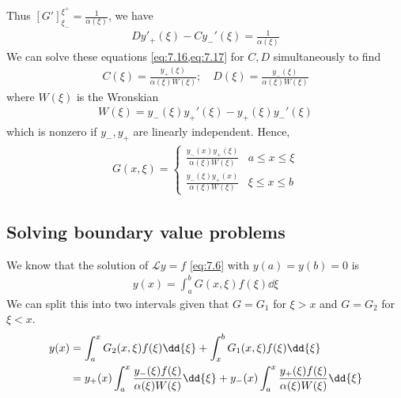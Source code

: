 Thus $[G']_{\xi_-}^{\xi^+} = \frac{1}{\alpha(\xi)}$, we have
\begin{align} \label{eq:7.17}
	Dy'_+(\xi) - C y_-'(\xi) = \frac{1}{\alpha(\xi)}
\end{align}
We can solve these equations \cref{eq:7.16,eq:7.17} for $C, D$ simultaneously to find
\begin{align} \label{eq:7.18}
	C(\xi) = \frac{y_+(\xi)}{\alpha(\xi)W(\xi)};\quad D(\xi) = \frac{y_-(\xi)}{\alpha(\xi)W(\xi)}
\end{align}
where $W(\xi)$ is the Wronskian
\begin{align} \label{eq:7.19}
	W(\xi) = y_-(\xi) y_+'(\xi) - y_+(\xi) y_-'(\xi)
\end{align}
which is nonzero if $y_-, y_+$ are linearly independent.
Hence,
\begin{align} \label{eq:7.20}
	G(x,\xi) = \begin{cases}
		\frac{y_-(x) y_+(\xi)}{\alpha(\xi)W(\xi)} & a \leq x \leq \xi \\
		\frac{y_-(\xi) y_+(x)}{\alpha(\xi)W(\xi)} & \xi \leq x \leq b
	\end{cases}
\end{align}

\subsection{Solving boundary value problems}
We know that the solution of $\mathcal L y = f$ \cref{eq:7.6} with $y(a) = y(b) = 0$ is
\begin{align*}
	y(x) = \int_a^b G(x,\xi) f(\xi) \dd{\xi}
\end{align*}
We can split this into two intervals given that $G = G_1$ for $\xi > x$ and $G = G_2$ for $\xi < x$.
\begin{align}
	y(x) & = \int_a^x G_2(x,\xi) f(\xi) \dd{\xi} + \int_x^b G_1(x,\xi) f(\xi) \dd{\xi} \notag \\
    & = y_+(x) \int_a^x \frac{y_-(\xi) f(\xi)}{\alpha(\xi)W(\xi)} \dd{\xi} + y_-(x) \int_a^x \frac{y_+(\xi) f(\xi)}{\alpha(\xi)W(\xi)} \dd{\xi} \label{eq:7.21}
\end{align}

